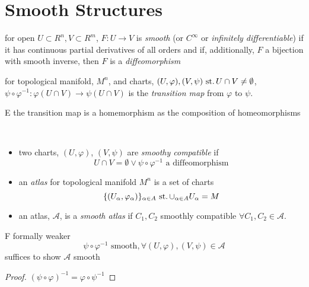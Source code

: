 \section{Smooth Structures}
\begin{defn}
  for open $U\subset R^n, V\subset R^m$,
  $F: U\rightarrow V$ is \emph{smooth}
  (or $C^\infty$ or \emph{infinitely differentiable})
  if it has continuous partial derivatives of all orders
  and if, additionally, $F$ a bijection with smooth inverse,
  then $F$ is a \emph{diffeomorphism}
\end{defn}

\begin{defn}
  for topological manifold, $M^n$, and
  charts, $(U,\varphi), (V,\psi) \operatorname{\,st.} U\cap V \neq \emptyset$,
  $\psi\circ\varphi^{-1}:\varphi(U\cap V)\rightarrow \psi(U\cap V)$
  is the \emph{transition map} from $\varphi$ to $\psi$.
\end{defn}

\begin{rem}{E}
  the transition map is a homemorphism
  as the composition of homeomorphisms
\end{rem}

\begin{defn}\
  \begin{itemize}
  \item
    two charts, $(U,\varphi)$, $(V,\psi)$ are
    \emph{smoothy compatible} if
    \[
    U\cap V=\emptyset \lor
    \psi\circ\varphi^{-1}\text{ a diffeomorphism}
    \]
  \item
    an \emph{atlas} for topological manifold $M^n$ is a set of charts
    \[
    \{(U_\alpha,\varphi_\alpha)\}_{\alpha\in A}
    \operatorname{\,st.} \cup_{\alpha\in A} U_\alpha = M
    \]
  \item
    an atlas, $\mathscr A$, is a \emph{smooth atlas}
    if $C_1, C_2$ smoothly compatible $\forall C_1, C_2\in\mathcal A$.
  \end{itemize}
\end{defn}

\begin{rem}{F}\label{rem:01:sm-atlas-equiv}
  formally weaker
  \[
  \psi\circ\varphi^{-1}\text{ smooth},
  \forall (U,\varphi),(V,\psi)\in\mathcal A
  \]
  suffices to show $\mathcal A$ smooth
\end{rem}
\begin{proof}
  $(\psi\circ\varphi)^{-1}=\varphi\circ\psi^{-1}$
\end{proof}

